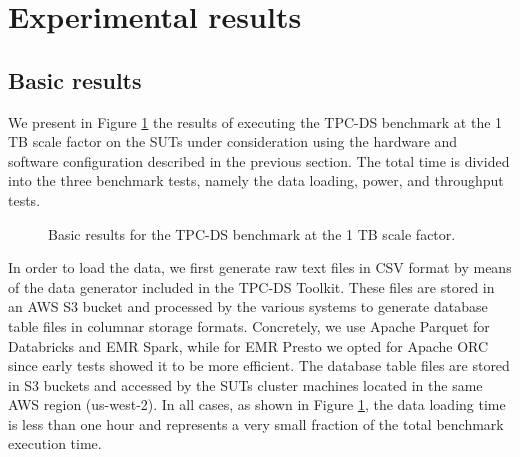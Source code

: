\section{Experimental results}\label{results}

\subsection{Basic results}\label{basicResults}

We present in Figure \ref{fig:basicResults} the results of executing the TPC-DS benchmark at the 1 TB scale factor on the SUTs under consideration using the hardware and software configuration described in the previous section. The total time is divided into the three benchmark tests, namely the data loading, power, and throughput tests.

\begin{figure}
   \begin{center}
   \end{center}
   \caption{Basic results for the TPC-DS benchmark at the 1 TB scale factor.}
   \label{fig:basicResults}
\end{figure}

In order to load the data, we first generate raw text files in CSV format by means of the data generator included in the TPC-DS Toolkit. These files are stored in an AWS S3 bucket and processed by the various systems to generate database table files in columnar storage formats. Concretely, we use Apache Parquet for Databricks and EMR Spark, while for EMR Presto we opted for Apache ORC since early tests showed it to be more efficient. The database table files are stored in S3 buckets and accessed by the SUTs cluster machines located in the same AWS region (us-west-2). In all cases, as shown in Figure \ref{fig:basicResults}, the data loading time is less than one hour and represents a very small fraction of the total benchmark execution time.

